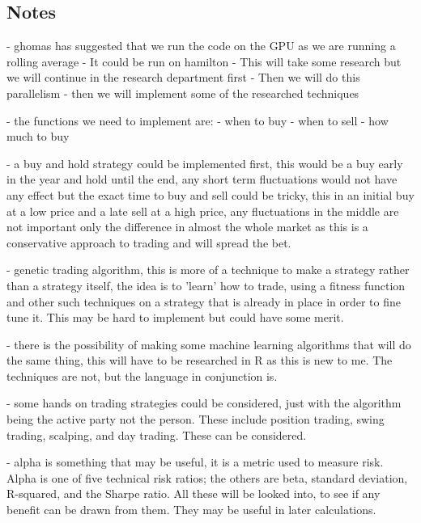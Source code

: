 \documentclass[12pt,a4paper]{article}
\begin{document}
\subsection*{Notes}
- ghomas has suggested that we run the code on the GPU as we are running a rolling average
- It could be run on hamilton
- This will take some research but we will continue in the research department first
- Then we will do this parallelism
- then we will implement some of the researched techniques

- the functions we need to implement are:
- when to buy
- when to sell
- how much to buy

- a buy and hold strategy could be implemented first, this would be a buy early in the year and hold until the end, any short term fluctuations would not have any effect but the exact time to buy and sell could be tricky, this in an initial buy at a low price and a late sell at a high price, any fluctuations in the middle are not important only the difference in almost the whole market as this is a conservative approach to trading and will spread the bet.

- genetic trading algorithm, this is more of a technique to make a strategy rather than a strategy itself, the idea is to 'learn' how to trade, using a fitness function and other such techniques on a strategy that is already in place in order to fine tune it. This may be hard to implement but could have some merit.

- there is the possibility of making some machine learning algorithms that will do the same thing, this will have to be researched in R as this is new to me. The techniques are not, but the language in conjunction is.

- some hands on trading strategies could be considered, just with the algorithm being the active party not the person. These include position trading, swing trading, scalping, and day trading. These can be considered.

- alpha is something that may be useful, it is a metric used to measure risk. Alpha is one of five technical risk ratios; the others are beta, standard deviation, R-squared, and the Sharpe ratio. All these will be looked into, to see if any benefit can be drawn from them. They may be useful in later calculations.
\fi
\end{document}
